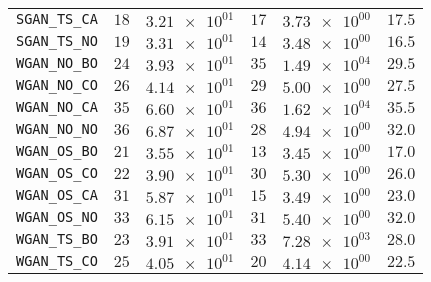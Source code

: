 \begin{table}[H]
\begin{tabularx}{\textwidth}{l||CC|CC||c}
		\texttt{SGAN\_TS\_CA} & $ 18$ & $ \num{3.21e+01}$ & $ 17$ & $ \num{3.73e+00}$ &$ 17.5$  \\
		\texttt{SGAN\_TS\_NO} & $ 19$ & $ \num{3.31e+01}$ & $ 14$ & $ \num{3.48e+00}$ &$ 16.5$  \\ \hline
		\texttt{WGAN\_NO\_BO} & $ 24$ & $ \num{3.93e+01}$ & $ 35$ & $ \num{1.49e+04}$ &$ 29.5$  \\
		\texttt{WGAN\_NO\_CO} & $ 26$ & $ \num{4.14e+01}$ & $ 29$ & $ \num{5.00e+00}$ &$ 27.5$  \\
		\texttt{WGAN\_NO\_CA} & $ 35$ & $ \num{6.60e+01}$ & $ 36$ & $ \num{1.62e+04}$ &$ 35.5$  \\
		\texttt{WGAN\_NO\_NO} & $ 36$ & $ \num{6.87e+01}$ & $ 28$ & $ \num{4.94e+00}$ &$ 32.0$  \\
		\texttt{WGAN\_OS\_BO} & $ 21$ & $ \num{3.55e+01}$ & $ 13$ & $ \num{3.45e+00}$ &$ 17.0$  \\
		\texttt{WGAN\_OS\_CO} & $ 22$ & $ \num{3.90e+01}$ & $ 30$ & $ \num{5.30e+00}$ &$ 26.0$  \\
		\texttt{WGAN\_OS\_CA} & $ 31$ & $ \num{5.87e+01}$ & $ 15$ & $ \num{3.49e+00}$ &$ 23.0$  \\
		\texttt{WGAN\_OS\_NO} & $ 33$ & $ \num{6.15e+01}$ & $ 31$ & $ \num{5.40e+00}$ &$ 32.0$  \\
		\texttt{WGAN\_TS\_BO} & $ 23$ & $ \num{3.91e+01}$ & $ 33$ & $ \num{7.28e+03}$ &$ 28.0$  \\
		\texttt{WGAN\_TS\_CO} & $ 25$ & $ \num{4.05e+01}$ & $ 20$ & $ \num{4.14e+00}$ &$ 22.5$  \\

\end{tabularx}
\end{table}
